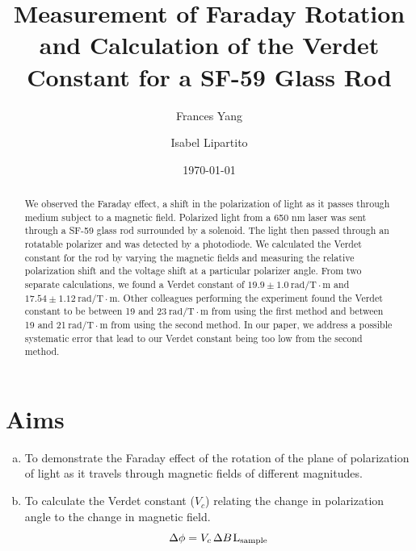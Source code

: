 \documentclass[prb,preprint]{revtex4-1}
\begin{document}
\title{Measurement of Faraday Rotation and Calculation of the Verdet Constant for a SF-59 Glass Rod}

\author{Frances Yang}

\author{Isabel Lipartito}

\date{\today}

\begin{abstract}
{We observed the Faraday effect, a shift in the polarization of light as it passes through medium subject to a magnetic field. Polarized light from a 650 nm laser was sent through a SF-59 glass rod surrounded by a solenoid. The light then passed through an rotatable polarizer and was detected by a photodiode. We calculated the Verdet constant for the rod by varying the magnetic fields and measuring the relative polarization shift and the voltage shift at a particular polarizer angle. From two separate calculations, we found a Verdet constant of $19.9 \pm 1.0 \mathrm{~rad/T} \cdot \textrm{m}$ and $17.54 \pm 1.12 \mathrm{~rad/T} \cdot \textrm{m}$. Other colleagues performing the experiment found the Verdet constant to be between 19 and 23$\mathrm{~rad/T} \cdot \textrm{m}$ from using the first method and between 19 and 21$\mathrm{~rad/T} \cdot \textrm{m}$ from using the second method.  In our paper, we address a possible systematic error that lead to our Verdet constant being too low from the second method.

}
\end{abstract}

\maketitle 
\section{Aims}
{
\begin{enumerate}[(a)]
\item To demonstrate the Faraday effect of the rotation of the plane of polarization of light as it travels through magnetic fields of different magnitudes.

\item To calculate the Verdet constant ($V_{c}$) relating the change in polarization angle to the change in magnetic field.
\begin{equation}
\label{vconst}
\Delta \phi =V_{c}\hspace{1.5pt} \Delta B\hspace{1pt}\textrm{L}{_{\textrm{sample}}}
\end{equation}
\end{enumerate}
}
\end{document}
